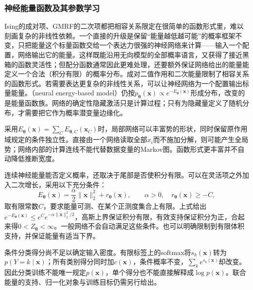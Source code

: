 \subsubsection{神经能量函数及其参数学习}
\label{sec:pgm-energy-models-flexible}

Ising的成对项、GMRF的二次项都把相容关系限定在很简单的函数形式里，难以刻画复杂的非线性依赖。一个直接的升级是保留“能量越低越可能”的概率框架不变，只把能量这个标量函数交给一个表达力很强的神经网络来计算——输入一个配置，网络输出它的能量。这样既能沿用无向模型的全部概率语言，又获得了接近黑箱的函数灵活性；但配分函数通常因此更难处理，还要额外保证网络给出的能量能定义一个合法（积分有限）的概率分布。成对二值作用和二次能量限制了相容关系的函数形式。若需要表达更复杂的非线性关系，可以让神经网络为一个配置输出标量能量。（neural energy-based model）仍按$p_{\bm{\theta}}(\bm{x})\propto e^{-E_{\bm{\theta}}(\bm{x})}$形成分布，改变的是能量函数族。网络的确定性隐藏激活只是计算过程；只有为隐藏量定义了随机分布，才需要把它作为概率潜变量边缘化。

采用$E_{\bm{\theta}}(\bm{x})=\sum_CE_{\bm{\theta},C}(\bm{x}_C)$时，局部网络可以丰富势的形状，同时保留原作用域规定的条件独立性。直接由一个网络读取全部$x_i$而不施加分解，则可能产生全局势；网络内部的计算连线不能代替数据变量的Markov图。函数形式更丰富并不自动降低推断宽度。

连续神经能量能否定义概率，还取决于尾部是否使积分有限。可以在灵活项之外加入二次增长，采用以下充分条件：
\[
  E_{\bm{\theta}}(\bm{x})
    =\frac{\alpha}{2}\lVert\bm{x}\rVert_2^2+r_{\bm{\theta}}(\bm{x}),
  \qquad \alpha>0,\quad r_{\bm{\theta}}(\bm{x})\geq-C,
\]
取有限常数$C$，要求能量可测、在某个正测度集合上有限。上式给出$e^{-E_{\bm{\theta}}(\bm{x})}\leq e^Ce^{-\alpha\lVert\bm{x}\rVert_2^2/2}$，高斯上界保证积分有限，有效支持保证积分为正，合起来得$0<Z_{\bm{\theta}}<\infty$。一般网络不会自动满足这些条件。也可以明确限制到有限体积支持，并保证能量有适当下界。

条件分类得分尚不足以确定输入密度。有限标签上的softmax将$s_k(\bm{x})$转为$p(Y=k\mid\bm{x})$；所有类别得分同时加$c(\bm{x})$，条件概率不变，$\sum_ke^{s_k(\bm{x})}$却改变。因此分类训练不能唯一规定$p(\bm{x})$，单个得分也不能直接解释成$\log p(\bm{x})$。联合能量的支持、归一化对象与训练目标仍需另行给出。

